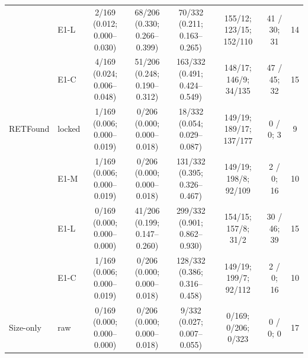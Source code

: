 \begin{tabular}{@{}llcccccc@{}}
 & E1-L & \makecell{2/169\\{\scriptsize (0.012; 0.000--0.030)}} & \makecell{68/206\\{\scriptsize (0.330; 0.266--0.399)}} & \makecell{70/332\\{\scriptsize (0.211; 0.163--0.265)}} & 155/12; 123/15; 152/110 & 41 / 30; 31 & 14 \\
 & E1-C & \makecell{4/169\\{\scriptsize (0.024; 0.006--0.048)}} & \makecell{51/206\\{\scriptsize (0.248; 0.190--0.312)}} & \makecell{163/332\\{\scriptsize (0.491; 0.424--0.549)}} & 148/17; 146/9; 34/135 & 47 / 45; 32 & 15 \\
\addlinespace[2pt]
RETFound & locked & \makecell{1/169\\{\scriptsize (0.006; 0.000--0.019)}} & \makecell{0/206\\{\scriptsize (0.000; 0.000--0.018)}} & \makecell{18/332\\{\scriptsize (0.054; 0.029--0.087)}} & 149/19; 189/17; 137/177 & 0 / 0; 3 & 9 \\
 & E1-M & \makecell{1/169\\{\scriptsize (0.006; 0.000--0.019)}} & \makecell{0/206\\{\scriptsize (0.000; 0.000--0.018)}} & \makecell{131/332\\{\scriptsize (0.395; 0.326--0.467)}} & 149/19; 198/8; 92/109 & 2 / 0; 16 & 10 \\
 & E1-L & \makecell{0/169\\{\scriptsize (0.000; 0.000--0.000)}} & \makecell{41/206\\{\scriptsize (0.199; 0.147--0.260)}} & \makecell{299/332\\{\scriptsize (0.901; 0.862--0.930)}} & 154/15; 157/8; 31/2 & 30 / 46; 39 & 15 \\
 & E1-C & \makecell{1/169\\{\scriptsize (0.006; 0.000--0.019)}} & \makecell{0/206\\{\scriptsize (0.000; 0.000--0.018)}} & \makecell{128/332\\{\scriptsize (0.386; 0.316--0.458)}} & 149/19; 199/7; 92/112 & 2 / 0; 16 & 10 \\
\addlinespace[2pt]
Size-only & raw & \makecell{0/169\\{\scriptsize (0.000; 0.000--0.000)}} & \makecell{0/206\\{\scriptsize (0.000; 0.000--0.018)}} & \makecell{9/332\\{\scriptsize (0.027; 0.007--0.055)}} & 0/169; 0/206; 0/323 & 0 / 0; 0 & 17 \\

\end{tabular}
